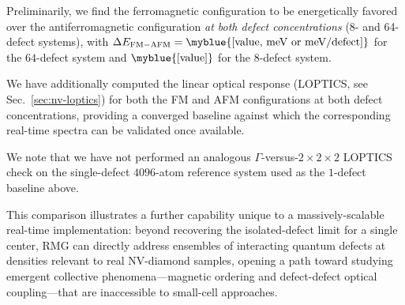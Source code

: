 Preliminarily, we find the ferromagnetic configuration to be
energetically favored over the antiferromagnetic configuration
\emph{at both defect concentrations} (8- and 64-defect systems), with
$\Delta E_{\mathrm{FM-AFM}} = \myblue{[\text{value, meV or meV/defect}]}$
for the $64$-defect system and
$\myblue{[\text{value}]}$ for the $8$-defect system.

We have additionally computed the linear optical response (LOPTICS, see
Sec.~\ref{sec:nv-loptics}) for both the FM and AFM configurations at both
defect concentrations, providing a converged baseline against which the
corresponding real-time spectra can be validated once available.

We note that we have not performed an analogous
$\Gamma$-versus-$2\times2\times2$ LOPTICS check on the single-defect
$4096$-atom reference system used as the $1$-defect baseline above.

This comparison illustrates a further capability unique to a
massively-scalable real-time implementation: beyond recovering the
isolated-defect limit for a single center, RMG can directly address
ensembles of interacting quantum defects at densities relevant to real
NV-diamond samples, opening a path toward studying emergent collective
phenomena---magnetic ordering and defect-defect optical
coupling---that are inaccessible to small-cell approaches.
